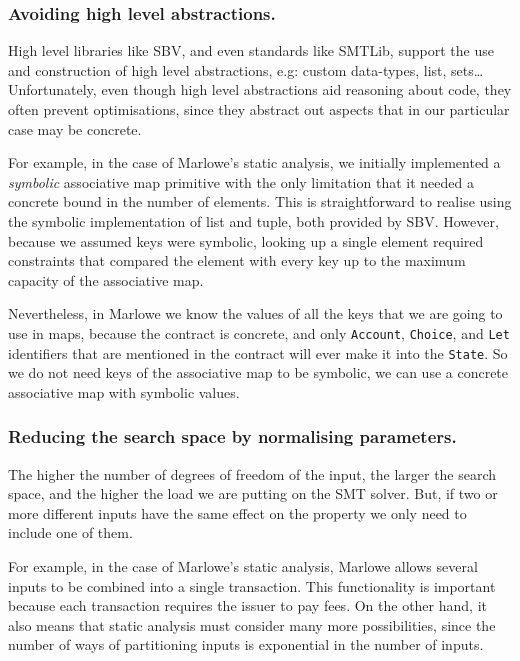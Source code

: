 \documentclass[english,runningheads]{llncs}
\begin{document}
\subsubsection{Avoiding high level abstractions.}

High level libraries like SBV, and even standards like SMTLib, support
the use and construction of high level abstractions,
e.g: custom data-types, list, sets\dots{} Unfortunately, even though
high level abstractions aid reasoning about code, they often
prevent optimisations, since they abstract out aspects that
in our particular case may be concrete.

For example, in the case of Marlowe's static analysis, we initially
implemented a \emph{symbolic} associative map primitive with the only limitation
that it needed a concrete bound in the number of elements. This is
straightforward to realise using the symbolic implementation of list
and tuple, both provided by SBV. However, because we assumed keys
were symbolic, looking up a single element required constraints that
compared the element with every key up to the maximum capacity of
the associative map.

Nevertheless, in Marlowe we know the values of all the keys that we are
going to use in maps, because the contract is concrete, and only \texttt{Account},
\texttt{Choice}, and \texttt{Let} identifiers that are mentioned in
the contract will ever make it into the \texttt{State}. So we do not
need keys of the associative map to be symbolic, we can use a concrete
associative map with symbolic values.

\subsubsection{Reducing the search space by normalising parameters.
\label{subsec:Reducing-search-space-by-normalising-parameters}}

The higher the number of degrees of freedom of the input, the larger
the search space, and the higher the load we are putting on the SMT
solver. But, if two or more different inputs have the same effect on the
property we only need to include one of them.

For example, in the case of Marlowe's static analysis,
Marlowe allows several inputs to be combined into a single transaction.
This functionality is important because each transaction requires
the issuer to pay fees. On the other hand, it also means
that static analysis must consider many more possibilities, since
the number of ways of partitioning inputs is exponential
in the number of inputs.
\end{document}
